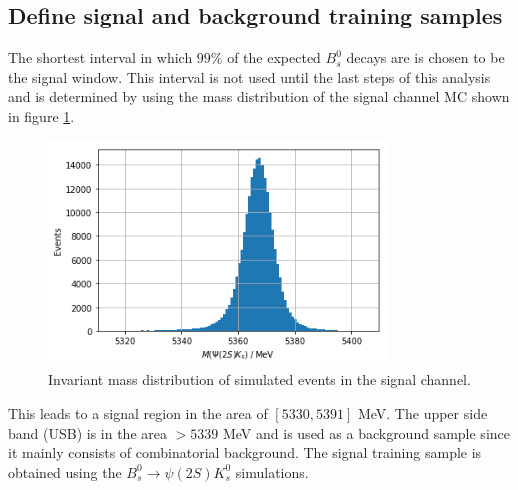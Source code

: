 \subsection{Define signal and background training samples}
The shortest interval in which $99\%$ of the expected $B^0_s$ decays are is chosen to be the signal window.
This interval is not used until the last steps of this analysis and is determined by using the mass distribution of the signal channel MC shown in figure \ref{fig:BM_MC}.
\begin{figure}[!htb]
  \centering
  \includegraphics[width=0.8\textwidth]{plots/BM_MC.png}
  \caption{Invariant mass distribution of simulated events in the signal channel.}
  \label{fig:BM_MC}
\end{figure}
This leads to a signal region in the area of $[5330, 5391]$ MeV.
The upper side band (USB) is in the area $>5339$ MeV and is used as a background sample since it mainly consists of combinatorial background.
The signal training sample is obtained using the $B_s^0\to\psi(2S)K_s^0$ simulations.

